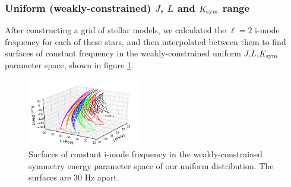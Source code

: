 \documentclass[fleqn,usenatbib]{mnras}
\begin{document}
\subsubsection{Uniform (weakly-constrained) $J$, $L$ and $K_{\rm sym}$ range}\label{subsec4_1_1}
\hspace{\parindent} After constructing a grid of stellar models, we calculated the $\ell = 2$ i-mode frequency for each of these stars, and then interpolated between them to find surfaces of constant frequency in the weakly-constrained uniform $J$,$L$,$K_{\rm sym}$ parameter space, shown in figure \ref{fig:grid_J_L_K}.




\begin{figure}
\centering
\includegraphics[width=0.45\textwidth,angle=0]{grid_J_L_K.png}
\caption{Surfaces of constant i-mode frequency in the weakly-constrained symmetry energy parameter space of our uniform distribution. The surfaces are $30$ Hz apart.}
\label{fig:grid_J_L_K}
\end{figure}

 
\end{document}
